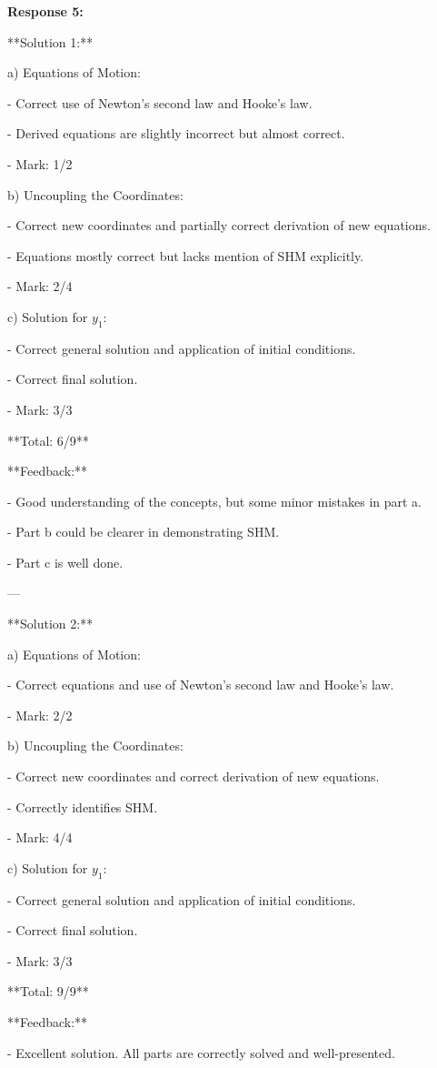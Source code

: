 \documentclass[a4paper,11pt]{article}
\begin{document}
\bigskip
\textbf{Response 5:}

**Solution 1:**

a) Equations of Motion:

- Correct use of Newton's second law and Hooke's law.

- Derived equations are slightly incorrect but almost correct.

- Mark: 1/2

b) Uncoupling the Coordinates:

- Correct new coordinates and partially correct derivation of new equations.

- Equations mostly correct but lacks mention of SHM explicitly.

- Mark: 2/4

c) Solution for \( y_1 \):

- Correct general solution and application of initial conditions.

- Correct final solution.

- Mark: 3/3

**Total: 6/9**

**Feedback:**

- Good understanding of the concepts, but some minor mistakes in part a.

- Part b could be clearer in demonstrating SHM.

- Part c is well done.

---

**Solution 2:**

a) Equations of Motion:

- Correct equations and use of Newton's second law and Hooke's law.

- Mark: 2/2

b) Uncoupling the Coordinates:

- Correct new coordinates and correct derivation of new equations.

- Correctly identifies SHM.

- Mark: 4/4

c) Solution for \( y_1 \):

- Correct general solution and application of initial conditions.

- Correct final solution.

- Mark: 3/3

**Total: 9/9**

**Feedback:**

- Excellent solution. All parts are correctly solved and well-presented.
\end{document}
